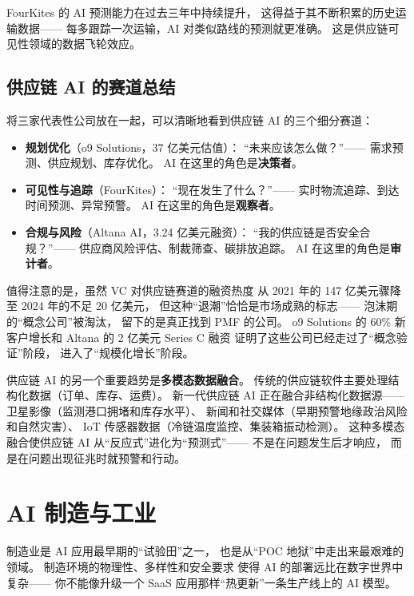 FourKites 的 AI 预测能力在过去三年中持续提升，
这得益于其不断积累的历史运输数据——
每多跟踪一次运输，AI 对类似路线的预测就更准确。
这是供应链可见性领域的数据飞轮效应。

\subsection{供应链 AI 的赛道总结}

将三家代表性公司放在一起，可以清晰地看到供应链 AI 的三个细分赛道：

\begin{itemize}[noitemsep]
  \item \textbf{规划优化}（o9 Solutions，37 亿美元估值）：
        ``未来应该怎么做？''——
        需求预测、供应规划、库存优化。
        AI 在这里的角色是\textbf{决策者}。
  \item \textbf{可见性与追踪}（FourKites）：
        ``现在发生了什么？''——
        实时物流追踪、到达时间预测、异常预警。
        AI 在这里的角色是\textbf{观察者}。
  \item \textbf{合规与风险}（Altana AI，3.24 亿美元融资）：
        ``我的供应链是否安全合规？''——
        供应商风险评估、制裁筛查、碳排放追踪。
        AI 在这里的角色是\textbf{审计者}。
\end{itemize}

值得注意的是，虽然 VC 对供应链赛道的融资热度
从 2021 年的 147 亿美元骤降至 2024 年的不足 20 亿美元，
但这种``退潮''恰恰是市场成熟的标志——
泡沫期的``概念公司''被淘汰，
留下的是真正找到 PMF 的公司。
o9 Solutions 的 60\% 新客户增长和
Altana 的 2 亿美元 Series C 融资
证明了这些公司已经走过了``概念验证''阶段，
进入了``规模化增长''阶段。

供应链 AI 的另一个重要趋势是\textbf{多模态数据融合}。
传统的供应链软件主要处理结构化数据（订单、库存、运费）。
新一代供应链 AI 正在融合非结构化数据源——
卫星影像（监测港口拥堵和库存水平）、
新闻和社交媒体（早期预警地缘政治风险和自然灾害）、
IoT 传感器数据（冷链温度监控、集装箱振动检测）。
这种多模态融合使供应链 AI 从``反应式''进化为``预测式''——
不是在问题发生后才响应，
而是在问题出现征兆时就预警和行动。


\section{AI 制造与工业}
\label{sec:ent-manufacturing}

制造业是 AI 应用最早期的``试验田''之一，
也是从``POC 地狱''中走出来最艰难的领域。
制造环境的物理性、多样性和安全要求
使得 AI 的部署远比在数字世界中复杂——
你不能像升级一个 SaaS 应用那样``热更新''一条生产线上的 AI 模型。

